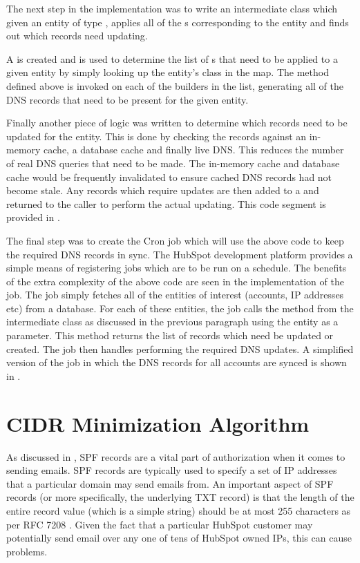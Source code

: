 The next step in the implementation was to write an intermediate class which given an entity of type , applies all of the s corresponding to the entity and finds out which records need updating. 

A  is created and is used to determine the list of s that need to be applied to a given entity by simply looking up the entity's class in the map. The  method defined above is invoked on each of the builders in the list, generating all of the DNS records that need to be present for the given entity. 

Finally another piece of logic was written to determine which records need to be updated for the entity. This is done by checking the records against an in-memory cache, a database cache and finally live DNS. This reduces the number of real DNS queries that need to be made. The in-memory cache and database cache would be frequently invalidated to ensure cached DNS records had not become stale. Any records which require updates are then added to a  and returned to the caller to perform the actual updating. This code segment is provided in  .

The final step was to create the Cron job which will use the above code to keep the required DNS records in sync. The HubSpot development platform provides a simple means of registering jobs which are to be run on a schedule. The benefits of the extra complexity of the above code are seen in the implementation of the job. The job simply fetches all of the entities of interest (accounts, IP addresses etc) from a database. For each of these entities, the job calls the method from the intermediate class as discussed in the previous paragraph using the entity as a parameter. This method returns the list of records which need be updated or created. The job then handles performing the required DNS updates. A simplified version of the job in which the DNS records for all accounts are synced is shown in  .

\break
\section{CIDR Minimization Algorithm}
As discussed in , SPF records are a vital part of authorization when it comes to sending emails. SPF records are typically used to specify a set of IP addresses that a particular domain may send emails from. An important aspect of SPF records (or more specifically, the underlying TXT record) is that the length of the entire record value (which is a simple string) should be at most 255 characters as per RFC 7208 \cite{spfRFC}. Given the fact that a particular HubSpot customer may potentially send email over any one of tens of HubSpot owned IPs, this can cause problems. 

